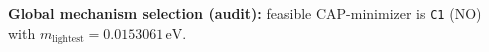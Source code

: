 \textbf{Global mechanism selection (audit):} feasible CAP-minimizer is \texttt{C1} (NO) with $m_{\mathrm{lightest}}=0.0153061\,\mathrm{eV}$.